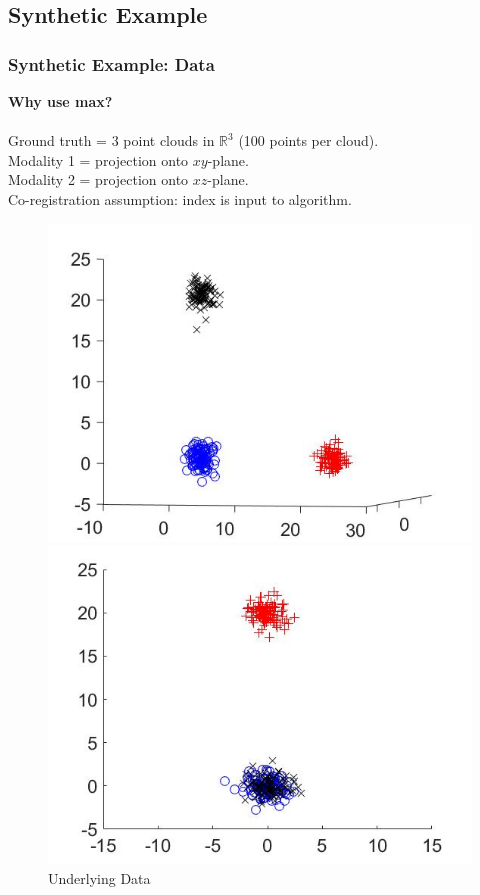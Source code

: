 \documentclass{beamer}
\begin{document}
\subsection{Synthetic Example}
\begin{frame}
  \frametitle{Synthetic Example: Data}
  \textbf{Why use max?}\\~\\
  Ground truth = 3 point clouds in $\mathbb{R}^3$ (100 points per cloud).\\
  Modality 1 = projection onto $xy$-plane.\\
  Modality 2 = projection onto $xz$-plane.\\
  Co-registration assumption: index is input to algorithm.
  \begin{figure}[ht]
    \begin{minipage}[b]{0.30\linewidth}
      \centering
      \includegraphics[width=\textwidth]{./Images/Synthetic/groundTruth.jpg}
      \caption{Underlying Data}
    \end{minipage}
    \begin{minipage}[b]{0.30\linewidth}
      \centering
      \includegraphics[width=\textwidth]{./Images/Synthetic/set1.jpg}

\end{minipage}
\end{figure}
\end{frame}
\end{document}
